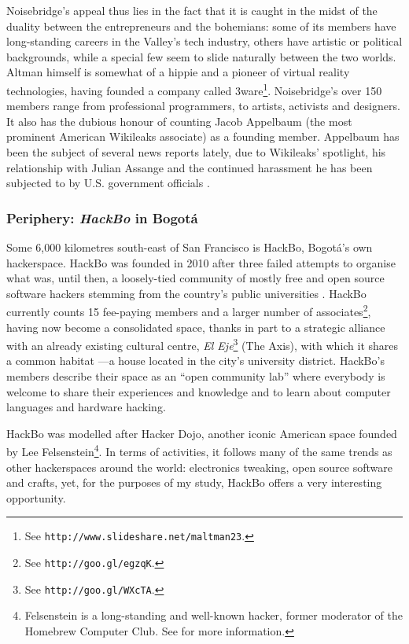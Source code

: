 Noisebridge's appeal thus lies in the fact that it is caught in the midst of the duality between the entrepreneurs and the bohemians: some of its members have long-standing careers in the Valley's tech industry, others have artistic or political backgrounds, while a special few seem to slide naturally between the two worlds. Altman himself is somewhat of a hippie and a pioneer of virtual reality technologies, having founded a company called 3ware\footnote{See \texttt{http://www.slideshare.net/maltman23}.}. Noisebridge's over 150 members range from professional programmers, to artists, activists and designers. It also has the dubious honour of counting Jacob Appelbaum (the most prominent American Wikileaks associate) as a founding member. Appelbaum has been the subject of several news reports lately, due to Wikileaks' spotlight, his relationship with Julian Assange \citep{rich10} and the continued harassment he has been subjected to by U.S. government officials \citep{mills10}.

\subsubsection{Periphery: \textit{HackBo} in Bogot\'{a}}

Some 6,000 kilometres south-east of San Francisco is HackBo, Bogot\'{a}'s own hackerspace. HackBo was founded in 2010 after three failed attempts to organise what was, until then, a loosely-tied community of mostly free and open source software hackers stemming from the country's public universities \citep{arizmendi11}. HackBo currently counts 15 fee-paying members and a larger number of associates\footnote{See \texttt{http://goo.gl/egzqK}.}, having now become a consolidated space, thanks in part to a strategic alliance with an already existing cultural centre, \textit{El Eje}\footnote{See \texttt{http://goo.gl/WXcTA}.} (The Axis), with which it shares a common habitat ---a house located in the city's university district. HackBo's members describe their space as an ``open community lab'' \citep{uribe11} where everybody is welcome to share their experiences and knowledge and to learn about computer languages and hardware hacking. 

HackBo was modelled after Hacker Dojo, another iconic American space founded by Lee Felsenstein\footnote{Felsenstein is a long-standing and well-known hacker, former moderator of the Homebrew Computer Club. See \citet{levy84} for more information.}. In terms of activities, it follows many of the same trends as other hackerspaces around the world: electronics tweaking, open source software and crafts, yet, for the purposes of my study, HackBo offers a very interesting opportunity.

